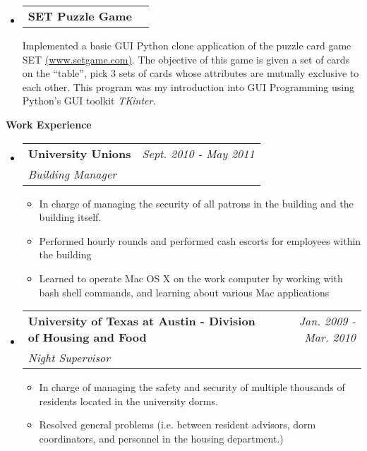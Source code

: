\documentclass[letterpaper,10pt]{article}
\makeatletter
\newcommand{\resheading}[1]{{\large \colorbox{mygrey}{\begin{minipage}{\textwidth}{\textbf{#1 \vphantom{p\^{E}}}}\end{minipage}}}}
\newcommand{\projectheading}[1]{
\begin{tabular*}{6.5in}{l@{\extracolsep{\fill}}r}
		\textbf{#1}
\end{tabular*}\vspace{6pt}}
\newcommand{\workheading}[3]{
\begin{tabular*}{6.5in}{l@{\extracolsep{\fill}}r}
		\textbf{#1} & \textit{#3} \\
		\textit{#2}
\end{tabular*}\vspace{6pt}}
\makeatother
\begin{document}
\begin{itemize}
{\begin{itemize}
				\end{itemize}
				}
		\item
			\projectheading{SET Puzzle Game}
				{
				\begin{itemize}
					{Implemented a basic GUI Python clone application of the puzzle card game SET \href{http://www.setgame.com}{(www.setgame.com)}.}
					{The objective of this game is given a set of cards on the ``table'', pick 3 sets of cards whose attributes}
					{are mutually exclusive to each other. This program was my introduction into GUI Programming using Python's GUI toolkit}
					{\textit{TKinter}.}
				\end{itemize}
				}
	\end{itemize}  %

\pagebreak

\resheading{Work Experience}
	\begin{itemize}
	 \item
	    \workheading{University Unions}{Building Manager}{Sept. 2010 - May 2011}
	      { \begin{itemize}
	        \item{In charge of managing the security of all patrons in the building and the building itself.}
	        \item{Performed hourly rounds and performed cash escorts for employees within the building}
		\item{Learned to operate Mac OS X on the work computer by working with bash shell commands, and learning about various Mac applications}
	        \end{itemize}
	      }

	 \item
	    \workheading{University of Texas at Austin - Division of Housing and Food}{Night Supervisor}{Jan. 2009 - Mar. 2010}
	      { \begin{itemize}
	         \item{In charge of managing the safety and security of multiple thousands of residents located in the university dorms.}
	         \item{Resolved general problems (i.e.  between resident advisors, dorm coordinators, and personnel in the housing department.)}
	        \end{itemize}
	      }
	\end{itemize} %

\end{document}
